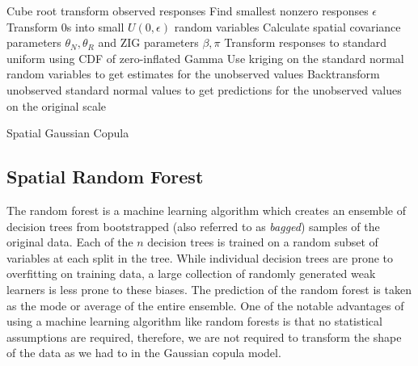 \documentclass{article}
\begin{document}
\begin{singlespace}
\begin{algorithm}[H]
\SetAlgoLined
{}
 {
	Cube root transform observed responses\; 
	Find smallest nonzero responses $\epsilon$ \;
	Transform 0s into small $U(0, \epsilon)$ random variables\;
	Calculate spatial covariance parameters $\theta_N, \theta_R$ and ZIG parameters $\beta, \pi$\;
	Transform responses to standard uniform using CDF of zero-inflated Gamma\; 
	Use kriging on the standard normal random variables to get estimates for the unobserved values \;
	Backtransform unobserved standard normal values to get predictions for the unobserved values on the original scale\; 
}
	\caption{Spatial Gaussian Copula}
\end{algorithm}
\end{singlespace}

\subsection{Spatial Random Forest}
The random forest is a machine learning algorithm which creates an ensemble of decision trees from bootstrapped (also referred to as \textit{bagged}) samples of the original data\cite{breiman01}.
Each of the $n$ decision trees is trained on a random subset of variables at each split in the tree.
While individual decision trees are prone to overfitting on training data, a large collection of randomly generated weak learners is less prone to these biases.
The prediction of the random forest is taken as the mode or average of the entire ensemble.
One of the notable advantages of using a machine learning algorithm like random forests is that no statistical assumptions are required, therefore, we are not required to transform the shape of the data as we had to in the Gaussian copula model.
\end{document}
